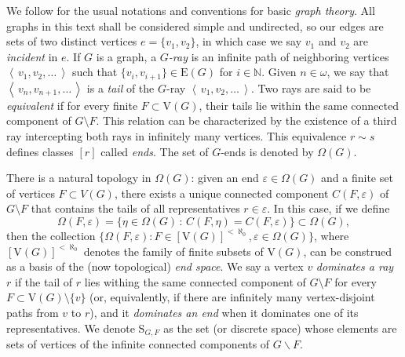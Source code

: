 \documentclass[10pt]{article}
\numberwithin{equation}{subsection}
\theoremstyle{remark}
\newcommand{\seq}[1]{{\left\langle \, {#1} \,\right\rangle}}
\begin{document}
We follow \cite{diestelgraphtheory} for the usual notations and conventions for basic \emph{graph theory}. All graphs in this text shall be considered simple and undirected, so our edges are sets of two distinct vertices $e = \{v_1,v_2\}$, in which case we say $v_1$ and $v_2$ are \emph{incident} in $e$. If $G$ is a graph, a \emph{$G$-ray} is an infinite path of neighboring vertices $\seq{v_1, v_2, \dotsc}$ such that $\{v_i,v_{i+1}\} \in \mathrm{E}(G)$ for $i \in \mathbb{N}$. Given $n\in\omega$, we say that $\seq{v_{n}, v_{n+1}, \dotsc}$ is a \emph{tail} of the $G$-ray $\seq{v_1, v_2, \dotsc}$. Two rays are said to be \emph{equivalent} if for every finite $F\subset \mathrm{V}(G)$, their tails lie within the same connected component of $G\setminus F$. This relation can be characterized by the existence of a third ray intercepting both rays in infinitely many vertices. This equivalence $r \sim s $ defines classes $[r]$ called \emph{ends}. The set of $G$-ends is denoted by $\Omega(G)$. 

There is a natural topology in $\Omega(G)$: given an end $\varepsilon\in \Omega (G)$ and a finite set of vertices $F\subset V(G)$, there exists a unique connected component $C(F,\varepsilon)$ of $G\setminus F$ that contains the tails of all representatives $r \in \varepsilon$. In this case, if we define  \[\Omega(F,\varepsilon)=\lbrace \eta \in \Omega (G) \,:\, C(F, \eta) = C(F, \varepsilon) \rbrace\subset \Omega(G) ,\]
then the collection $\lbrace \Omega (F, \varepsilon) : F\in [\mathrm{V}(G)]^{<\aleph_0}, \varepsilon\in \Omega (G)\rbrace$, where $[\mathrm{V}(G)]^{<\aleph_0}$ denotes the family of finite subsets of $\mathrm{V}(G)$, can be construed as a basis of the (now topological) \emph{end space}. We say a vertex $v$ \emph{dominates a ray} $r$ if the tail of $r$ lies withing the same connected component of $G\setminus F$ for every $F\subset \mathrm{V}(G)\setminus \{v\}$ (or, equivalently, if there are infinitely many vertex-disjoint paths from $v$ to $r$), and it \emph{dominates an end} when it dominates one of its representatives. We denote $\mathrm{S}_{G,F}$ as the set (or discrete space) whose elements are sets of vertices of the infinite connected components of $G \backslash F$. 
\end{document}

